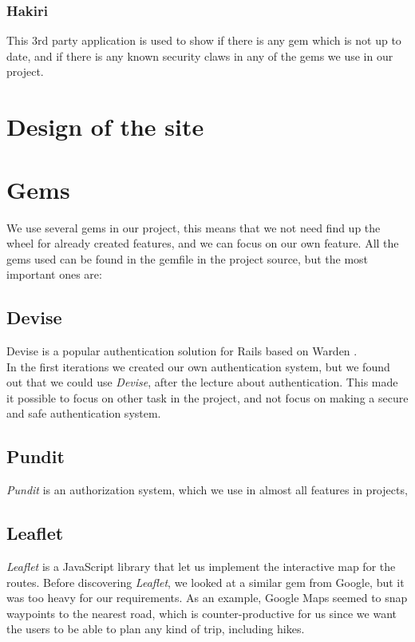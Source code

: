 \documentclass[a4paper]{article}
\begin{document}
\subsubsection{Hakiri}
This 3rd party application is used to show if there is any gem which is not up to date, and if there is any known security claws in any of the gems we use in our project.

\section{Design of the site}

\section{Gems}
We use several gems in our project, this means that we not need find up the wheel for already created features, and we can focus on our own feature. All the gems used can be found in the gemfile in the project source, but the most important ones are:
\subsection{Devise}
Devise is a popular authentication solution for Rails based on Warden \cite{devise}. \\
In the first iterations we created our own authentication system, but we found out that we could use \textit{Devise}, after the lecture about authentication. This made it possible to focus on other task in the project, and not focus on making a secure and safe authentication system. 

\subsection{Pundit}
\textit{Pundit} is an authorization system, which we use in almost all features in projects, 

\subsection{Leaflet}
\textit{Leaflet}\cite{leaflet} is a JavaScript library that let us implement the interactive map for the routes. Before discovering \textit{Leaflet}, we looked at a similar gem from Google, but it was too heavy for our requirements. As an example, Google Maps seemed to snap waypoints to the nearest road, which is counter-productive for us since we want the users to be able to plan any kind of trip, including hikes.
\end{document}
